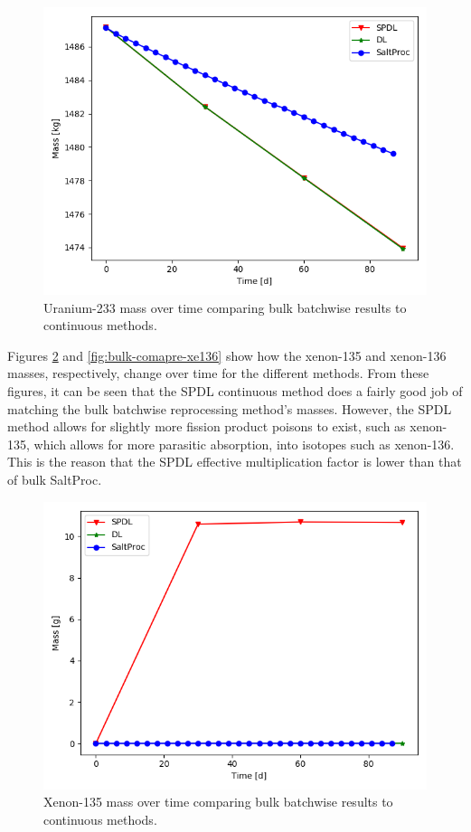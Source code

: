 \begin{figure}[H]
  \centering
  \includegraphics[scale=0.7]{images/soln-3-U233.png}
  \caption{Uranium-233 mass over time comparing bulk batchwise results to continuous methods.}
   \label{fig:bulk-comapre-u233}
\end{figure}

Figures \ref{fig:bulk-comapre-xe135} and \ref{fig:bulk-comapre-xe136} show how the xenon-135 and xenon-136 masses, respectively, change over time for the different methods. From these figures, it can be seen that the SPDL continuous method does a fairly good job of matching the bulk batchwise reprocessing method's masses. However, the SPDL method allows for slightly more fission product poisons to exist, such as xenon-135, which allows for more parasitic absorption, into isotopes such as xenon-136. This is the reason that the SPDL effective multiplication factor is lower than that of bulk SaltProc.

\begin{figure}[H]
  \centering
  \includegraphics[scale=0.7]{images/soln-3-Xe135.png}
  \caption{Xenon-135 mass over time comparing bulk batchwise results to continuous methods.}
   \label{fig:bulk-comapre-xe135}
\end{figure}


